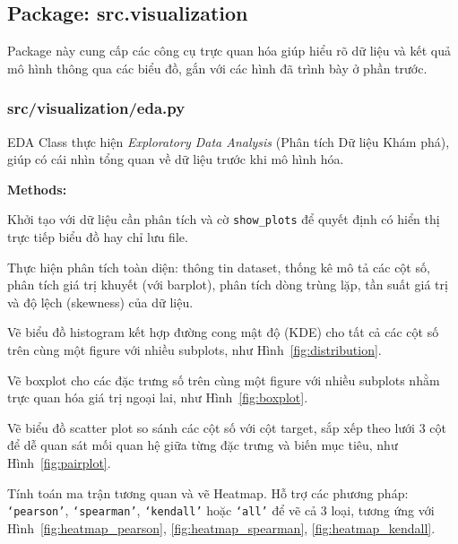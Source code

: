 \documentclass[12pt,a4paper]{article}
\newenvironment{methodlist}{
    \begin{description}[style=nextline, font=\ttfamily\color{sklearn-blue}]
}{
    \end{description}
}
\begin{document}
\subsection{Package: src.visualization}

Package này cung cấp các công cụ trực quan hóa giúp hiểu rõ dữ liệu và kết quả mô hình thông qua các biểu đồ, gắn với các hình đã trình bày ở phần trước.

\subsubsection{src/visualization/eda.py}

\begin{classbox}{EDA}
Class thực hiện \textit{Exploratory Data Analysis} (Phân tích Dữ liệu Khám phá), giúp có cái nhìn tổng quan về dữ liệu trước khi mô hình hóa.

\vspace{0.2cm}
\textbf{Methods:}
\begin{methodlist}
    \item[\_\_init\_\_(data, show\_plots)] 
    Khởi tạo với dữ liệu cần phân tích và cờ \texttt{show\_plots} để quyết định có hiển thị trực tiếp biểu đồ hay chỉ lưu file.
    
    \item[summary\_statistics(save\_path)] 
    Thực hiện phân tích toàn diện: thông tin dataset, thống kê mô tả các cột số, phân tích giá trị khuyết (với barplot), phân tích dòng trùng lặp, tần suất giá trị và độ lệch (skewness) của dữ liệu.
    
    \item[data\_distribution(save\_path)] 
    Vẽ biểu đồ histogram kết hợp đường cong mật độ (KDE) cho tất cả các cột số trên cùng một figure với nhiều subplots, như Hình~\ref{fig:distribution}.
    
    \item[boxplot\_analysis(save\_path)] 
    Vẽ boxplot cho các đặc trưng số trên cùng một figure với nhiều subplots nhằm trực quan hóa giá trị ngoại lai, như Hình~\ref{fig:boxplot}.
    
    \item[pairplot\_analysis(target\_column, save\_path)] 
    Vẽ biểu đồ scatter plot so sánh các cột số với cột target, sắp xếp theo lưới 3 cột để dễ quan sát mối quan hệ giữa từng đặc trưng và biến mục tiêu, như Hình~\ref{fig:pairplot}.
    
    \item[correlation\_analysis(method, save\_path)] 
    Tính toán ma trận tương quan và vẽ Heatmap. Hỗ trợ các phương pháp: \texttt{`pearson'}, \texttt{`spearman'}, \texttt{`kendall'} hoặc \texttt{`all'} để vẽ cả 3 loại, tương ứng với Hình~\ref{fig:heatmap_pearson}, \ref{fig:heatmap_spearman}, \ref{fig:heatmap_kendall}.
    

\end{methodlist}
\end{classbox}
\end{document}
